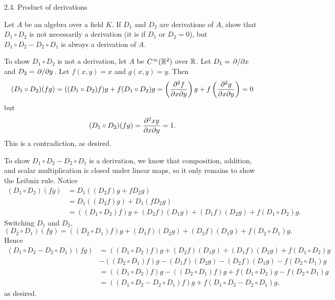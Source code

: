 \begin{problem}{2.4. Product of derivations}
    
    Let $A$ be an algebra over a field $K$. If $D_1$ and $D_2$ are derivations of $A$, show that $D_1 \circ D_2$ is not
necessarily a derivation (it is if $D_1$ or $D_2 = 0$), but $D_1 \circ D_2 - D_2 \circ D_1$ is always a derivation of
$A$.
\end{problem}

To show $D_1 \circ D_2$ is not a derivation, let $A$ be $C^{\infty}(\mathbb{R}^2)$ over $\mathbb{R}$. 
Let $D_1 = \pdv*{x}$ and $D_2 = \pdv*{y}$. Let $f(x, y) = x$ and $g(x, y) = y$. Then
\begin{align}
    (D_1 \circ D_2)(fg) = ((D_1 \circ D_2)f) g + f(D_1 \circ D_2)g = \left(\pdv{f}{x}{y}\right) g + f \left(\pdv{g}{x}{y}\right) = 0
\end{align}
but 
\begin{align}
    (D_1 \circ D_2)(fg) = \pdv{xy}{x}{y} = 1 .
\end{align}
This is a contradiction, as desired.

To show $D_1 \circ D_2 - D_2 \circ D_1$ is a derivation, we know that composition, addition, and scalar multiplication 
is closed under linear maps, so it only remains to show the Leibniz rule. Notice 
\begin{align}
    (D_1 \circ D_2)(fg) &= D_1((D_2f) g + f D_2g) \\ 
    &= D_1 ((D_2f) g) + D_1 (f D_2g ) \\ 
    &= ((D_1 \circ D_2)f) g + (D_2f)(D_1g) + (D_1 f)(D_2g) + f (D_1 \circ D_2)g .
\end{align}
Switching $D_1$ and $D_2$, 
\begin{equation}
    (D_2 \circ D_1)(fg) = ((D_2 \circ D_1)f) g + (D_1f)(D_2g) + (D_2 f)(D_1g) + f (D_2 \circ D_1)g .
\end{equation}
Hence 
\begin{align}
    (D_1 \circ D_2 - D_2 \circ D_1)(fg) &= ((D_1 \circ D_2)f) g + (D_2f)(D_1g) + (D_1 f)(D_2g) + f (D_1 \circ D_2)g \\ 
    &- ((D_2 \circ D_1)f) g - (D_1f)(D_2g) - (D_2 f)(D_1g) - f (D_2 \circ D_1)g  \\ 
    &= ((D_1 \circ D_2)f) g - ((D_2 \circ D_1)f) g + f (D_1 \circ D_2)g - f (D_2 \circ D_1)g \\ 
    &= ((D_1 \circ D_2 - D_2 \circ D_1)f) g + f(D_1 \circ D_2 - D_2 \circ D_1)g, 
\end{align}
as desired.
